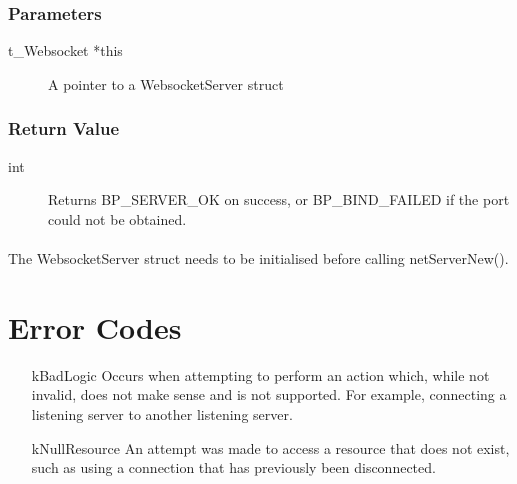 \documentclass[12pt,fleqn]{book} %
\begin{document}
\subsubsection{Parameters}
\begin{description}
	\item[t\_Websocket *this] A pointer to a WebsocketServer struct
\end{description}

\subsubsection{Return Value}
\begin{description}
	\item[int] Returns BP\_SERVER\_OK on success, or BP\_BIND\_FAILED if the port could not be obtained.
\end{description}

\paragraph{}
The WebsocketServer struct needs to be initialised before calling netServerNew().

\section{Error Codes}

\begin{enumerate}
	\item [kBadLogic] Occurs when attempting to perform an action which, while not invalid, does not make sense and is not supported. For example, connecting a listening server to another listening server.
	\item [kNullResource] An attempt was made to access a resource that does not exist, such as using a connection that has previously been disconnected.
\end{enumerate}

\end{document}
